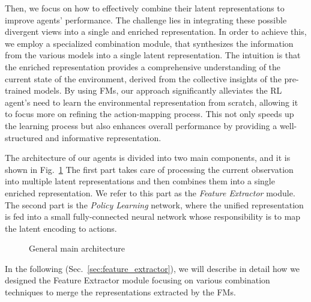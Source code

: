 Then, we focus on how to effectively combine their latent representations to improve agents' performance.
The challenge lies in integrating these possible divergent views into a single and enriched representation.
In order to achieve this, we employ a specialized combination module, that synthesizes the information from the various models into a single latent representation.
The intuition is that the enriched representation provides a comprehensive understanding of the current state of the environment, derived from the collective insights of the pre-trained models.
By using FMs, our approach significantly alleviates the RL agent's need to learn the environmental representation from scratch, allowing it to focus more on refining the action-mapping process.
This not only speeds up the learning process but also enhances overall performance by providing a well-structured and informative representation.

The architecture of our agents is divided into two main components, and it is shown in Fig.~\ref{fig:main}
The first part takes care of processing the current observation into multiple latent representations and then combines them into a single enriched representation.
We refer to this part as the \textit{Feature Extractor} module.
The second part is the \textit{Policy Learning} network, where the unified representation is fed into a small fully-connected neural network whose responsibility is to map the latent encoding to actions.


\begin{figure}[ht]
    \begin{center}
        \fbox{\rule[-.5cm]{0cm}{4cm} \rule[-.5cm]{4cm}{0cm}}
    \end{center}
    \caption{General main architecture}
    \label{fig:main}
\end{figure}


In the following (Sec.~\ref{sec:feature_extractor}), we will describe in detail how we designed the Feature Extractor module focusing on various combination techniques to merge the representations extracted by the FMs.









